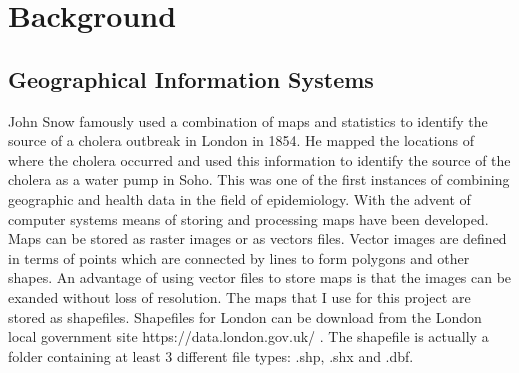 
\chapter{Background} %

\label{Chapter3} %





\section{Geographical Information Systems}
John Snow famously used a combination of maps and statistics to identify the source of a cholera outbreak in London in 1854. He mapped the locations of where the cholera occurred and used this information to identify the source of the cholera as a water pump in Soho. This was one of the first instances of combining geographic and health data in the field of epidemiology.
With the advent of computer systems means of storing and processing maps have been developed. Maps can be stored as raster images or as vectors files. Vector images are defined in terms of points which are connected by lines to form polygons and other shapes. An advantage of using vector files to store maps is that the images can be exanded without loss of resolution.
The maps that I use for this project are stored as shapefiles. Shapefiles for London can be download from the London local government site https://data.london.gov.uk/ . The shapefile is actually a folder containing at least 3 different file types: .shp, .shx and .dbf.

